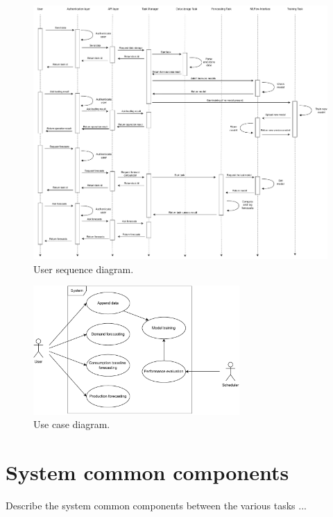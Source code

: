 \begin{figure}[H]
\centering 
\includegraphics[width=1\textwidth]{images/architecture_user_sequence} 
\caption{User sequence diagram.}
\label{fig:usersequence}
\end{figure}

\begin{figure}[H]
\centering 
\includegraphics[width=0.7\textwidth]{images/architecture_use_case} 
\caption{Use case diagram.}
\label{fig:usecase}
\end{figure}


\section{System common components}
\label{sec:components}
\vspace{0.2 cm}

Describe the system common components between the various tasks ...

